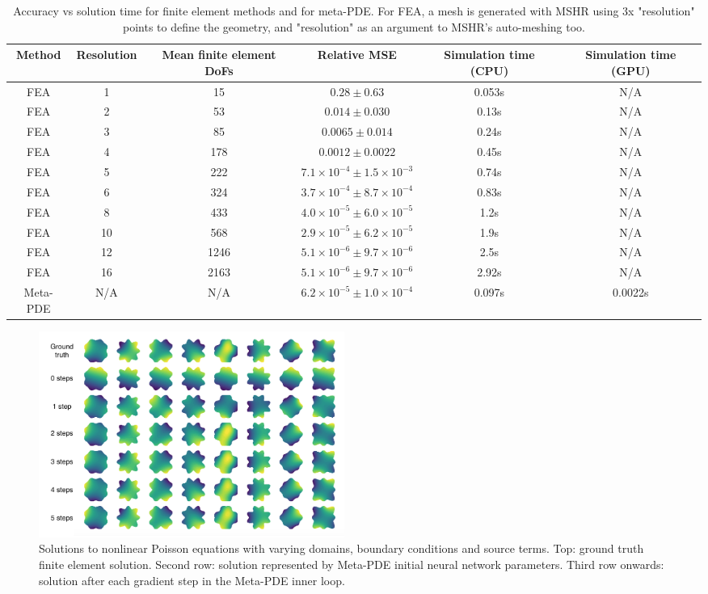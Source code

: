 \begin{table}
\begin{adjustbox}{max width=\textwidth}
\begin{tabular}{|c|ccccc|}
 \hline
 Method & Resolution & Mean finite element DoFs & Relative MSE & Simulation time (CPU) & Simulation time (GPU) \\
 \hline
 FEA & 1 & 15 & $0.28 \pm 0.63$ & 0.053s & N/A \\
 FEA & 2 & 53 & $0.014 \pm 0.030$ & 0.13s & N/A \\
 FEA & 3 & 85 & $0.0065 \pm 0.014$ & 0.24s & N/A \\
 FEA & 4 & 178 & $0.0012 \pm 0.0022$ & 0.45s & N/A \\
 FEA & 5 & 222 & $7.1\times 10^{-4} \pm 1.5\times 10^{-3}$ & 0.74s & N/A \\
 FEA & 6 & 324 & $3.7\times 10^{-4} \pm 8.7\times 10^{-4}$ & 0.83s & N/A \\
 FEA & 8 & 433 & $4.0\times 10^{-5} \pm 6.0\times 10^{-5}$ & 1.2s & N/A \\
 FEA & 10 & 568 & $2.9\times 10^{-5} \pm 6.2\times 10^{-5}$ & 1.9s & N/A \\
 FEA & 12 & 1246 & $5.1\times 10^{-6} \pm 9.7\times 10^{-6}$ & 2.5s & N/A \\
 FEA & 16 & 2163  & $5.1\times 10^{-6} \pm 9.7\times 10^{-6}$ & 2.92s & N/A \\
 Meta-PDE & N/A & N/A & $6.2\times 10^{-5} \pm 1.0\times 10^{-4}$  & 0.097s & 0.0022s \\
 \hline
\end{tabular}
\end{adjustbox}
\caption{
Accuracy vs solution time for finite element methods and for meta-PDE.
For FEA, a mesh is generated with MSHR using 3x "resolution" points
to define the geometry, and "resolution" as an argument to MSHR's
auto-meshing too.}
\label{tbl:results}
\end{table}

\begin{figure}[t]
  \centering
\includegraphics[width=10cm]{meta-pde/figures/poisson_meta_labeled.png}
\caption{\small
Solutions to nonlinear Poisson equations with varying domains, boundary conditions
and source terms. Top: ground truth finite element solution.
Second row: solution represented by Meta-PDE initial neural network parameters.
Third row onwards: solution after each gradient step in the Meta-PDE inner loop.}%
\label{fig:results_per_step}%
\end{figure}

